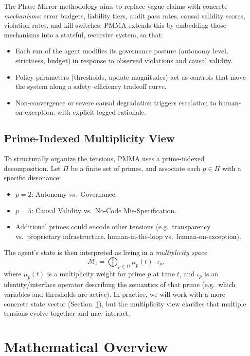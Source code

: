 \documentclass[11pt]{article}
\begin{document}
The Phase Mirror methodology aims to replace vague claims with concrete \emph{mechanisms}: error budgets, liability tiers, audit pass rates, causal validity scores, violation rates, and kill-switches.
PMMA extends this by embedding those mechanisms into a stateful, recursive system, so that:
\begin{itemize}
  \item Each run of the agent modifies its governance posture (autonomy level, strictness, budget) in response to observed violations and causal validity.
  \item Policy parameters (thresholds, update magnitudes) act as controls that move the system along a safety--efficiency tradeoff curve.
  \item Non-convergence or severe causal degradation triggers escalation to human-on-exception, with explicit logged rationale.
\end{itemize}

\subsection{Prime-Indexed Multiplicity View}

To structurally organize the tensions, PMMA uses a prime-indexed decomposition.
Let $\Pi$ be a finite set of primes, and associate each
$p\in\Pi$ with a specific dissonance:
\begin{itemize}
  \item $p=2$: Autonomy vs.\ Governance.
  \item $p=5$: Causal Validity vs.\ No-Code Mis-Specification.
  \item Additional primes could encode other tensions (e.g.\ transparency vs.\ proprietary infrastructure, human-in-the-loop vs.\ human-on-exception).
\end{itemize}

The agent's state is then interpreted as living in a \emph{multiplicity space}
\[
  \mathcal{M}_t = \bigoplus_{p \in \Pi} \mu_p(t) \cdot \iota_p,
\]
where $\mu_p(t)$ is a multiplicity weight for prime $p$ at time $t$, and $\iota_p$ is an identity/interface operator describing the semantics of that prime (e.g.\ which variables and thresholds are active).
In practice, we will work with a more concrete state vector (Section~\ref{sec:math-overview}), but the multiplicity view clarifies that multiple tensions evolve together and may interact.

\section{Mathematical Overview}
\label{sec:math-overview}
\end{document}
